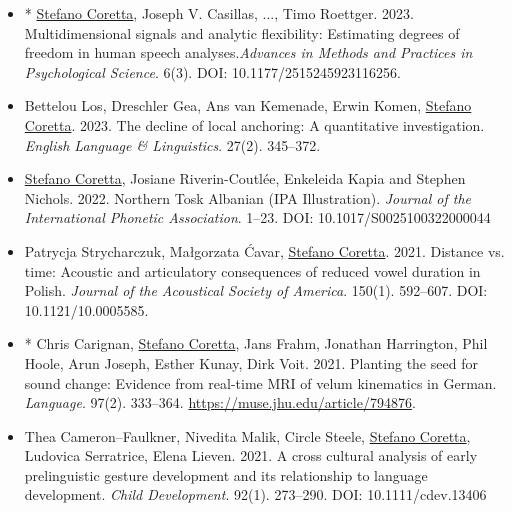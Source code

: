 \documentclass{article}
\begin{document}
\begin{itemize}
\item * \underline{Stefano Coretta}, Joseph V. Casillas, ..., Timo Roettger. 2023. Multidimensional signals and analytic flexibility: Estimating degrees of freedom in human speech analyses.\textit{Advances in Methods and Practices in Psychological Science}. 6(3). DOI: 10.1177/2515245923116256.

\item Bettelou Los, Dreschler Gea, Ans van Kemenade, Erwin Komen, \underline{Stefano Coretta}. 2023. The decline of local anchoring: A quantitative investigation. \textit{English Language \& Linguistics}. 27(2). 345--372.

\item \underline{Stefano Coretta}, Josiane Riverin-Coutlée, Enkeleida Kapia and Stephen Nichols. 2022. Northern Tosk Albanian (IPA Illustration). \textit{Journal of the International Phonetic Association}. 1--23. DOI: 10.1017/S0025100322000044

\item Patrycja Strycharczuk, Małgorzata Ćavar, \underline{Stefano Coretta}. 2021. Distance vs. time: Acoustic and articulatory consequences of reduced vowel duration in Polish. \textit{Journal of the Acoustical Society of America}. 150(1). 592--607. DOI: 10.1121/10.0005585.

\item * Chris Carignan, \underline{Stefano Coretta}, Jans Frahm, Jonathan Harrington, Phil Hoole, Arun Joseph, Esther Kunay, Dirk Voit. 2021. Planting the seed for sound change: Evidence from real-time MRI of velum kinematics in German. \textit{Language}. 97(2). 333--364. \url{https://muse.jhu.edu/article/794876}.

\item Thea Cameron--Faulkner, Nivedita Malik, Circle Steele, \underline{Stefano Coretta}, Ludovica Serratrice, Elena Lieven. 2021. A cross cultural analysis of early prelinguistic gesture development and its relationship to language development. \textit{Child Development}. 92(1). 273--290. DOI: 10.1111/cdev.13406
\end{itemize}
\end{document}
